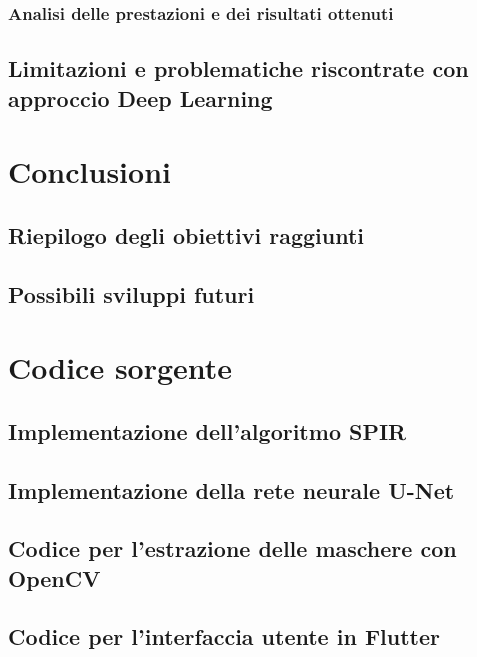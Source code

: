 \documentclass[a4paper,12pt]{report}
\begin{document}
    \subsection{Analisi delle prestazioni e dei risultati ottenuti}
  \section{Limitazioni e problematiche riscontrate con approccio Deep Learning}

\chapter{Conclusioni}
  \section{Riepilogo degli obiettivi raggiunti}
  \section{Possibili sviluppi futuri}

\chapter{Codice sorgente}
  \section{Implementazione dell'algoritmo SPIR}
  \section{Implementazione della rete neurale U-Net}
  \section{Codice per l'estrazione delle maschere con OpenCV}
  \section{Codice per l'interfaccia utente in Flutter}

  
  
\end{document}
